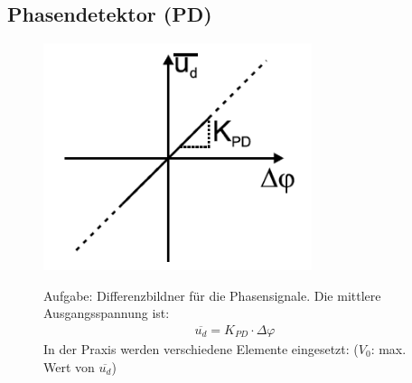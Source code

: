 \subsection{Phasendetektor (PD)}
\begin{figure}[h!]
	\begin{minipage}{0.25\textwidth} 
       \includegraphics[width=0.7\textwidth]{images/Phasen_Detekt}
    \vspace{0.2cm}
	\end{minipage}
	\begin{minipage}{0.75\textwidth}
	   Aufgabe: Differenzbildner für die Phasensignale. Die mittlere Ausgangsspannung ist: 
	   \begin{equation*}
         \begin{split}
            \overline{u_d}=K_{PD}\cdot \Delta \varphi
         \end{split}
        \end{equation*}
        In der Praxis werden verschiedene Elemente eingesetzt: ($V_0$: max. Wert von $\overline{u_d}$)
	\end{minipage}
\end{figure}

